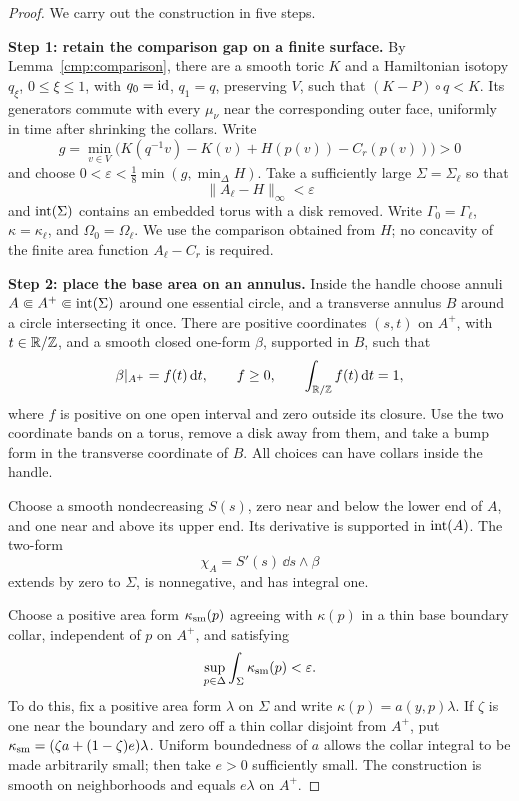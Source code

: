 \begin{proof}
We carry out the construction in five steps.

\medskip\noindent
\textbf{Step 1: retain the comparison gap on a finite surface.}
By Lemma~\ref{cmp:comparison}, there are a smooth toric $K$ and a
Hamiltonian isotopy $q_\xi$, $0\leq\xi\leq1$, with $q_0=\mathrm{id}$,
$q_1=q$, preserving $V$, such that $(K-P)\circ q<K$.
Its generators commute with every $\mu_\nu$ near the corresponding
outer face, uniformly in time after shrinking the collars.
Write
\[
 g=\min_{v\in V}\bigl(K(q^{-1}v)-K(v)+H(p(v))-C_r(p(v))\bigr)>0
\]
and choose
$0<\varepsilon<\frac18\min(g,\min_\Delta H)$.
Take a sufficiently large $\Sigma=\Sigma_\ell$ so that
\begin{equation}\label{surf:area-error}
                  \|A_\ell-H\|_\infty<\varepsilon
\end{equation}
and $\operatorname{int}(\Sigma)$ contains an embedded torus with a disk removed.
Write $\Gamma_0=\Gamma_\ell$, $\kappa=\kappa_\ell$, and
$\Omega_0=\Omega_\ell$.
We use the comparison obtained from $H$; no concavity of the finite
area function $A_\ell-C_r$ is required.

\medskip\noindent
\textbf{Step 2: place the base area on an annulus.}
Inside the handle choose annuli $A\Subset A^+\Subset\operatorname{int}(\Sigma)$
around one essential circle, and a transverse annulus $B$ around a
circle intersecting it once.  There are positive coordinates
$(s,t)$ on $A^+$, with $t\in\mathbb R/\mathbb Z$, and a smooth closed one-form
$\beta$, supported in $B$, such that
\begin{equation}\label{surf:handle-form}
 \beta|_{A^+}=f(t)\,\mathrm d t,\qquad f\geq0,\qquad
 \int_{\mathbb R/\mathbb Z}f(t)\,\mathrm d t=1,
\end{equation}
where $f$ is positive on one open interval and zero outside its
closure.  Use the two coordinate bands on a torus, remove a disk
away from them, and take a bump form in the transverse coordinate
of $B$.  All choices can have collars inside the handle.

Choose a smooth nondecreasing $S(s)$, zero near and below the lower
end of $A$, and one near and above its upper end.  Its derivative
is supported in $\operatorname{int}(A)$.  The two-form
\[
              \chi_A=S'(s)\,\dd s\wedge\beta
\]
extends by zero to $\Sigma$, is nonnegative, and has integral one.

Choose a positive area form $\kappa_{\rm sm}(p)$ agreeing with
$\kappa(p)$ in a thin base boundary collar, independent of $p$
on $A^+$, and satisfying
\begin{equation}\label{surf:small-area}
                  \sup_{p\in\Delta}\int_\Sigma\kappa_{\rm sm}(p)
                     <\varepsilon.
\end{equation}
To do this, fix a positive area form $\lambda$ on $\Sigma$ and
write $\kappa(p)=a(y,p)\lambda$.  If $\zeta$ is one near the
boundary and zero off a thin collar disjoint from $A^+$, put
$\kappa_{\rm sm}=(\zeta a+(1-\zeta)e)\lambda$.
Uniform boundedness of $a$ allows the collar integral to be made
arbitrarily small; then take $e>0$ sufficiently small.
The construction is smooth on neighborhoods and equals $e\lambda$
on $A^+$.


\end{proof}
